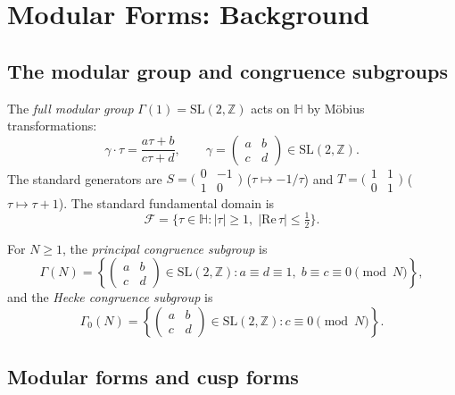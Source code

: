 \documentclass[12pt,a4paper]{amsart}
\theoremstyle{definition}
\begin{document}
\section{Modular Forms: Background}

\subsection{The modular group and congruence subgroups}

The \emph{full modular group} $\Gamma(1) = \mathrm{SL}(2,\mathbb{Z})$ acts
on $\mathbb{H}$ by M\"obius transformations:
\[
  \gamma \cdot \tau = \frac{a\tau + b}{c\tau + d}, \qquad
  \gamma = \begin{pmatrix} a & b \\ c & d \end{pmatrix} \in \mathrm{SL}(2,\mathbb{Z}).
\]
The standard generators are $S = \bigl(\begin{smallmatrix}0&-1\\1&0\end{smallmatrix}\bigr)$
($\tau \mapsto -1/\tau$) and $T = \bigl(\begin{smallmatrix}1&1\\0&1\end{smallmatrix}\bigr)$
($\tau \mapsto \tau + 1$). The standard fundamental domain is
\[
  \mathcal{F} = \{\tau \in \mathbb{H} : \lvert \tau \rvert \ge 1,\;
  \lvert \mathrm{Re}\,\tau \rvert \le \tfrac{1}{2}\}.
\]

For $N \ge 1$, the \emph{principal congruence subgroup} is
\[
  \Gamma(N) = \left\{ \begin{pmatrix}a&b\\c&d\end{pmatrix} \in \mathrm{SL}(2,\mathbb{Z})
  : a \equiv d \equiv 1,\; b \equiv c \equiv 0 \pmod{N} \right\},
\]
and the \emph{Hecke congruence subgroup} is
\[
  \Gamma_0(N) = \left\{ \begin{pmatrix}a&b\\c&d\end{pmatrix} \in \mathrm{SL}(2,\mathbb{Z})
  : c \equiv 0 \pmod{N} \right\}.
\]

\subsection{Modular forms and cusp forms}
\end{document}
